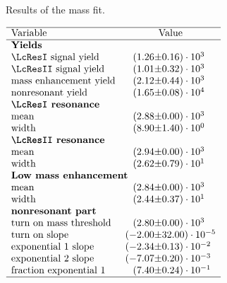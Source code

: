  
\begin{table}[h]
    \centering
    \caption{Results of the \Dz\proton mass fit.}
    \label{tab:fit_mD0p_RS}
    $\begin{array}{lr@{\pm}l}
    \hline
    \text{Variable} & \multicolumn{2}{c}{\text{Value}} \\
    \hline
        \multicolumn{3}{l}{\text{\textbf{Yields}}} \\
\text{\LcResI signal yield}&(1.26 & 0.16) \cdot 10^{3}\\
\text{\LcResII signal yield}&(1.01 & 0.32) \cdot 10^{3}\\
\text{mass enhancement yield}&(2.12 & 0.44) \cdot 10^{3}\\
\text{nonresonant yield}&(1.65 & 0.08) \cdot 10^{4}\\
\multicolumn{3}{l}{\text{\textbf{\LcResI resonance}}} \\
\text{mean}&(2.88 & 0.00) \cdot 10^{3}\\
\text{width}&(8.90 & 1.40) \cdot 10^{0}\\
\multicolumn{3}{l}{\text{\textbf{\LcResII resonance}}} \\
\text{mean}&(2.94 & 0.00) \cdot 10^{3}\\
\text{width}&(2.62 & 0.79) \cdot 10^{1}\\
\multicolumn{3}{l}{\text{\textbf{Low mass enhancement}}} \\
\text{mean}&(2.84 & 0.00) \cdot 10^{3}\\
\text{width}&(2.44 & 0.37) \cdot 10^{1}\\
\multicolumn{3}{l}{\text{\textbf{nonresonant part}}} \\
\text{turn on mass threshold}&(2.80 & 0.00) \cdot 10^{3}\\
\text{turn on slope}&(-2.00 & 32.00) \cdot 10^{-5}\\
\text{exponential 1 slope}&(-2.34 & 0.13) \cdot 10^{-2}\\
\text{exponential 2 slope}&(-7.07 & 0.20) \cdot 10^{-3}\\
\text{fraction exponential 1}&(7.40 & 0.24) \cdot 10^{-1}\\

\hline
\end{array}$
\end{table}
    